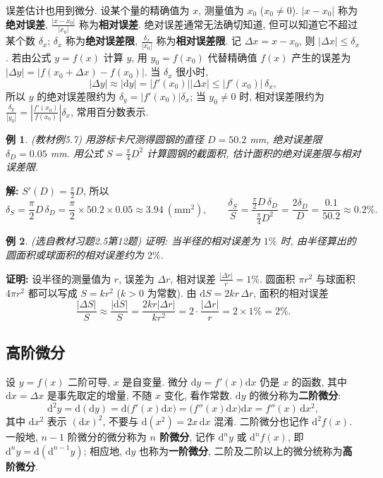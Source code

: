 \documentclass[UTF8,openany]{ctexbook}
\theoremstyle{chinesetextbook}
\newtheorem{example}{例}[section]
\newenvironment{cnproof}{\par\indent\textbf{证明:} \ignorespaces}{\par}
\newenvironment{cnsolution}{\par\indent\textbf{解:} \ignorespaces}{\par}
\newcommand{\dd}{\mathrm d}
\begin{document}
误差估计也用到微分. 设某个量的精确值为 $x$, 测量值为 $x_0$ ($x_0\ne0$). $|x-x_0|$ 称为\textbf{绝对误差}, $\displaystyle\frac{|x-x_0|}{|x_0|}$ 称为\textbf{相对误差}. 绝对误差通常无法确切知道, 但可以知道它不超过某个数 $\delta_x$; $\delta_x$ 称为\textbf{绝对误差限}, $\displaystyle\frac{\delta_x}{|x_0|}$ 称为\textbf{相对误差限}. 记 $\Delta x=x-x_0$, 则 $|\Delta x|\le\delta_x$. 若由公式 $y=f(x)$ 计算 $y$, 用 $y_0=f(x_0)$ 代替精确值 $f(x)$ 产生的误差为 $|\Delta y|=|f(x_0+\Delta x)-f(x_0)|$. 当 $\delta_x$ 很小时,
\[
|\Delta y|\approx|\dd y|=|f'(x_0)||\Delta x|\le|f'(x_0)|\,\delta_x,
\]
所以 $y$ 的绝对误差限约为 $\delta_y=|f'(x_0)|\delta_x$; 当 $y_0\ne0$ 时, 相对误差限约为 $\displaystyle\frac{\delta_y}{|y_0|}=\left|\frac{f'(x_0)}{f(x_0)}\right|\delta_x$, 常用百分数表示.
\begin{example}\label{ex:c2-5-7}
\textnormal{(教材例5.7)} 用游标卡尺测得圆钢的直径 $D=50.2$ mm, 绝对误差限 $\delta_D=0.05$ mm. 用公式 $\displaystyle S=\frac\pi4D^2$ 计算圆钢的截面积, 估计面积的绝对误差限与相对误差限.
\end{example}
\begin{cnsolution}
$\displaystyle S'(D)=\frac\pi2D$, 所以
\[
\delta_S=\frac\pi2D\,\delta_D=\frac\pi2\times50.2\times0.05\approx3.94\ (\text{mm}^2),\qquad\frac{\delta_S}S=\frac{\frac\pi2D\,\delta_D}{\frac\pi4D^2}=\frac{2\delta_D}D=\frac{0.1}{50.2}\approx0.2\%.
\]
\end{cnsolution}
\begin{example}\label{ex:c2-h5-12}
\textnormal{(选自教材习题2.5第12题)} 证明: 当半径的相对误差为 $1\%$ 时, 由半径算出的圆面积或球面积的相对误差约为 $2\%$.
\end{example}
\begin{cnproof}
设半径的测量值为 $r$, 误差为 $\Delta r$, 相对误差 $\displaystyle\frac{|\Delta r|}r=1\%$. 圆面积 $\pi r^2$ 与球面积 $4\pi r^2$ 都可以写成 $S=kr^2$ ($k>0$ 为常数). 由 $\dd S=2kr\,\Delta r$, 面积的相对误差
\[
\frac{|\Delta S|}S\approx\frac{|\dd S|}S=\frac{2kr|\Delta r|}{kr^2}=2\cdot\frac{|\Delta r|}r=2\times1\%=2\%.
\]
\end{cnproof}
\subsection{高阶微分}
设 $y=f(x)$ 二阶可导, $x$ 是自变量. 微分 $\dd y=f'(x)\dd x$ 仍是 $x$ 的函数, 其中 $\dd x=\Delta x$ 是事先取定的增量, 不随 $x$ 变化, 看作常数. $\dd y$ 的微分称为\textbf{二阶微分}:
\[
\dd^2y=\dd(\dd y)=\dd\bigl(f'(x)\dd x\bigr)=\bigl(f''(x)\dd x\bigr)\dd x=f''(x)\,\dd x^2,
\]
其中 $\dd x^2$ 表示 $(\dd x)^2$, 不要与 $\dd(x^2)=2x\,\dd x$ 混淆. 二阶微分也记作 $\dd^2f(x)$. 一般地, $n-1$ 阶微分的微分称为 \textbf{$n$ 阶微分}, 记作 $\dd^ny$ 或 $\dd^nf(x)$, 即 $\dd^ny=\dd(\dd^{n-1}y)$; 相应地, $\dd y$ 也称为\textbf{一阶微分}, 二阶及二阶以上的微分统称为\textbf{高阶微分}.
\end{document}
